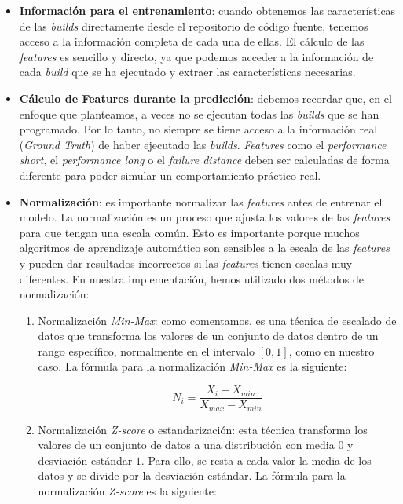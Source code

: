\begin{itemize}
    \item \textbf{Información para el entrenamiento}: cuando obtenemos las características de las \textit{builds}
    directamente desde el repositorio de código fuente, tenemos acceso a la información completa
    de cada una de ellas. El cálculo de las \textit{features} es sencillo y directo, ya que
    podemos acceder a la información de cada \textit{build} que se ha ejecutado y extraer las
    características necesarias.\\
    
    \item \textbf{Cálculo de Features durante la predicción}: debemos recordar que, en el
    enfoque que planteamos, a veces no se ejecutan todas las \textit{builds} que se han
    programado. Por lo tanto, no siempre se tiene acceso a la información real (\textit{Ground
    Truth}) de haber ejecutado las \textit{builds}. \textit{Features} como el \textit{performance
    short}, el \textit{performance long} o el \textit{failure distance} deben ser calculadas
    de forma diferente para poder simular un comportamiento práctico real.\\

    \item \textbf{Normalización}: es importante normalizar las \textit{features} antes de
    entrenar el modelo. La normalización es un proceso que ajusta los valores de las
    \textit{features} para que tengan una escala común. Esto es importante porque muchos
    algoritmos de aprendizaje automático son sensibles a la escala de las \textit{features} y
    pueden dar resultados incorrectos si las \textit{features} tienen escalas muy diferentes.
    En nuestra implementación, hemos utilizado dos métodos de normalización:

    \begin{enumerate}
        \item Normalización \textit{Min-Max}: como comentamos, es una técnica de escalado de datos
        que transforma los valores de un conjunto de datos dentro de un rango específico,
        normalmente en el intervalo $[0, 1]$, como en nuestro caso. La fórmula para la
        normalización \textit{Min-Max} es la siguiente:

        \begin{equation}
            N_{i} = \frac{X_{i} - X_{min}}{X_{max} - X_{min}}
        \end{equation}

        \item Normalización \textit{Z-score} o estandarización: esta técnica transforma los
        valores de un conjunto de datos a una distribución con media $0$ y desviación estándar $1$.
        Para ello, se resta a cada valor la media de los datos y se divide por la desviación
        estándar. La fórmula para la normalización \textit{Z-score} es la siguiente:


\end{enumerate}
\end{itemize}
